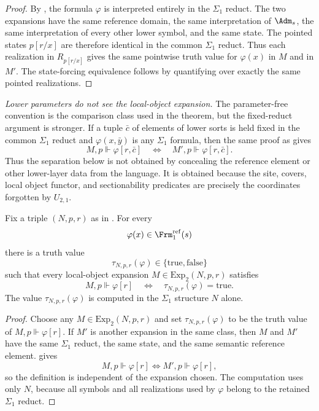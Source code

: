 \begin{proof}
By , the formula $\varphi$ is interpreted entirely in the $\Sigma_1$ reduct. The two expansions have the same reference domain, the same interpretation of $\Adm_s$, the same interpretation of every other lower symbol, and the same state. The pointed states $p[r/x]$ are therefore identical in the common $\Sigma_1$ reduct. Thus each realization in $R_{p[r/x]}$ gives the same pointwise truth value for $\varphi(x)$ in $M$ and in $M'$. The state-forcing equivalence follows by quantifying over exactly the same pointed realizations.
\end{proof}

\medskip
\noindent\emph{Lower parameters do not see the local-object expansion.}
The parameter-free convention is the comparison class used in the theorem, but the fixed-reduct argument is stronger. If a tuple $\bar c$ of elements of lower sorts is held fixed in the common $\Sigma_1$ reduct and $\varphi(x,\bar y)$ is any $\Sigma_1$ formula, then the same proof as  gives
\[
M,p\Vdash \varphi[r,\bar c]
\quad\Longleftrightarrow\quad
M',p\Vdash \varphi[r,\bar c].
\]
Thus the separation below is not obtained by concealing the reference element or other lower-layer data from the language. It is obtained because the site, covers, local object functor, and sectionability predicates are precisely the coordinates forgotten by $U_{2,1}$.
\medskip

\begin{lemma}\label{lem:lower-truth-function-fixed-reduct}
Fix a triple $(N,p,r)$ as in . For every
\[
\varphi(x)\in\Frm_1^{\mathrm{ref}}(s)
\]
there is a truth value
\[
\tau_{N,p,r}(\varphi)\in\{\mathrm{true},\mathrm{false}\}
\]
such that every local-object expansion $M\in\mathrm{Exp}_2(N,p,r)$ satisfies
\[
M,p\Vdash\varphi[r]
\quad\Longleftrightarrow\quad
\tau_{N,p,r}(\varphi)=\mathrm{true}.
\]
The value $\tau_{N,p,r}(\varphi)$ is computed in the $\Sigma_1$ structure $N$ alone.
\end{lemma}

\begin{proof}
Choose any $M\in\mathrm{Exp}_2(N,p,r)$ and set $\tau_{N,p,r}(\varphi)$ to be the truth value of $M,p\Vdash\varphi[r]$. If $M'$ is another expansion in the same class, then $M$ and $M'$ have the same $\Sigma_1$ reduct, the same state, and the same semantic reference element.  gives
\[
M,p\Vdash\varphi[r]\Longleftrightarrow M',p\Vdash\varphi[r],
\]
so the definition is independent of the expansion chosen. The computation uses only $N$, because all symbols and all realizations used by $\varphi$ belong to the retained $\Sigma_1$ reduct.
\end{proof}

